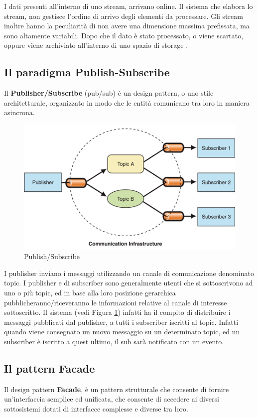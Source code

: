 \documentclass[12pt]{article}
\begin{document}
I dati presenti all'interno di uno stream, arrivano online. Il sistema che elabora lo stream, non gestisce l'ordine di arrivo degli elementi da processare. Gli stream inoltre hanno la peculiarità di non avere una dimensione massima prefissata, ma sono altamente variabili. Dopo che il dato è stato processato, o viene scartato, oppure viene archiviato all'interno di uno spazio di storage \cite{Babcock:2002:MID:543613.543615}.

\subsection{Il paradigma Publish-Subscribe}
Il \textbf{Publisher/Subscribe} (pub/sub) è un design pattern, o uno stile architetturale, organizzato in modo che le entità comunicano tra loro in maniera asincrona.

\begin{figure}[H]
	\centering
	\includegraphics[scale=0.50]{images/pubsub.jpg}
	\caption{Publish/Subscribe}
	\label{pubsub}
\end{figure}

I publisher inviano i messaggi utilizzando un canale di comunicazione denominato topic. I publisher e di subscriber sono generalmente utenti che si sottoscrivono ad uno o più topic, ed in base alla loro posizione gerarchica pubblicheranno/riceveranno le informazioni relative al canale di interesse sottoscritto. Il sistema (vedi Figura \ref{pubsub}) infatti ha il compito di distribuire i messaggi pubblicati dal publisher, a tutti i subscriber iscritti al topic. Infatti quando viene consegnato un nuovo messaggio su un determinato topic, ed un subscriber è iscritto a quest ultimo, il sub sarà notificato con un evento.

\subsection{Il pattern Facade}
Il design pattern \textbf{Facade}, è un pattern strutturale che consente di fornire un'interfaccia semplice ed unificata, che consente di accedere ai diversi sottosistemi dotati di interfacce complesse e diverse tra loro.
\end{document}
